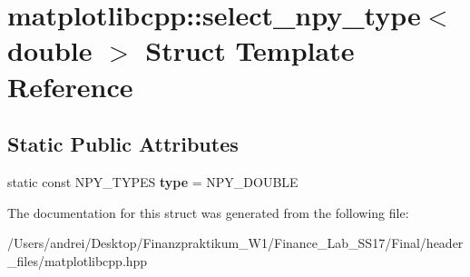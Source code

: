 \hypertarget{structmatplotlibcpp_1_1select__npy__type_3_01double_01_4}{}\section{matplotlibcpp\+:\+:select\+\_\+npy\+\_\+type$<$ double $>$ Struct Template Reference}
\label{structmatplotlibcpp_1_1select__npy__type_3_01double_01_4}
\subsection*{Static Public Attributes}
\begin{DoxyCompactItemize}
\item 
\mbox{\label{structmatplotlibcpp_1_1select__npy__type_3_01double_01_4_a939edaf81fedb879c8c90ad13c98a709}} 
static const N\+P\+Y\+\_\+\+T\+Y\+P\+ES {\bfseries type} = N\+P\+Y\+\_\+\+D\+O\+U\+B\+LE
\end{DoxyCompactItemize}


The documentation for this struct was generated from the following file\+:\begin{DoxyCompactItemize}
\item 
/\+Users/andrei/\+Desktop/\+Finanzpraktikum\+\_\+\+W1/\+Finance\+\_\+\+Lab\+\_\+\+S\+S17/\+Final/header\+\_\+files/matplotlibcpp.\+hpp\end{DoxyCompactItemize}
